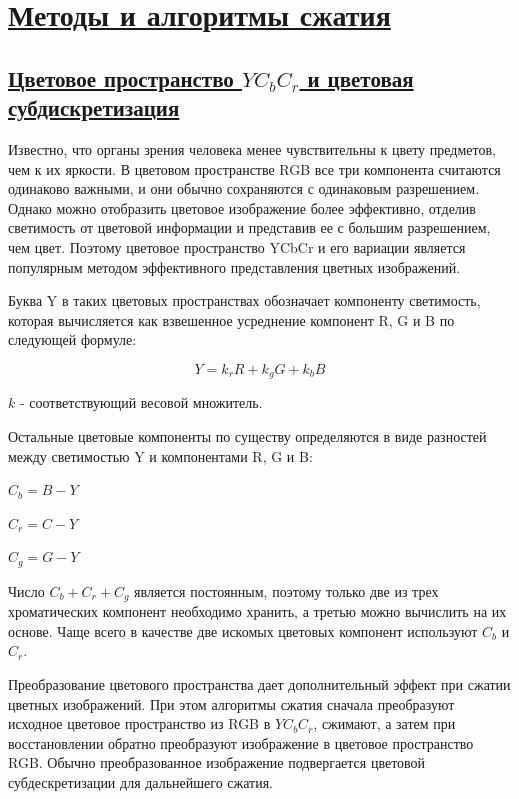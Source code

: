 \section*{\hyperlink{toc}{Методы и алгоритмы сжатия}}

\subsection*{\hyperlink{toc}{Цветовое пространство $YC_bC_r$ и цветовая субдискретизация}}

Известно, что органы зрения человека менее чувствительны к цвету предметов, чем к их яркости. В цветовом пространстве RGB все три компонента считаются одинаково важными, и они обычно сохраняются с одинаковым разрешением. Однако можно отобразить цветовое изображение более эффективно, отделив светимость от цветовой информации и представив ее с большим разрешением, чем цвет. Поэтому цветовое пространство YCbCr и его вариации является популярным методом эффективного представления цветных изображений. 

Буква Y в таких цветовых пространствах обозначает компоненту светимость, которая вычисляется как взвешенное усреднение компонент R, G и B по следующей формуле: 

\begin{displaymath}
	Y = k_rR + k_gG + k_bB
\end{displaymath}

$k$ - соответствующий весовой множитель.

Остальные цветовые компоненты по существу определяются в виде разностей между светимостью Y и компонентами R, G и B: 

\begin{center}
	$C_b = B - Y$ 

	$C_r = C - Y$ 

	$C_g = G - Y$ 
\end{center}


Число $C_b+C_r+C_g$ является постоянным, поэтому только две из трех хроматических компонент необходимо хранить, а третью можно вычислить на их основе. Чаще всего в качестве две искомых цветовых компонент используют $C_b$ и $C_r$. 


Преобразование цветового пространства дает дополнительный эффект при сжатии цветных изображений. При этом алгоритмы сжатия сначала преобразуют исходное цветовое пространство из RGB в $YC_bC_r$, сжимают, а затем при восстановлении обратно преобразуют изображение в цветовое пространство RGB. Обычно преобразованное изображение подвергается цветовой субдескретизации для дальнейшего сжатия.


